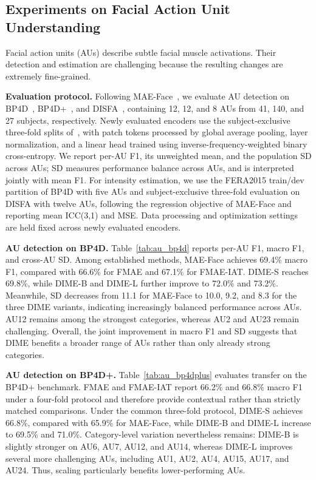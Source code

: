 \documentclass[10pt,journal,compsoc]{IEEEtran}
\begin{document}
\subsection{Experiments on Facial Action Unit Understanding}
\label{sec:exp_au}

Facial action units (AUs) describe subtle facial muscle activations. Their detection and estimation are challenging because the resulting changes are extremely fine-grained.

\noindent\textbf{Evaluation protocol.} Following MAE-Face~\cite{ma2024facial}, we evaluate AU detection on BP4D~\cite{zhang2014bp4d}, BP4D+~\cite{zhang2016multimodal}, and DISFA~\cite{mavadati2013disfa}, containing 12, 12, and 8 AUs from 41, 140, and 27 subjects, respectively. Newly evaluated encoders use the subject-exclusive three-fold splits of~\cite{ma2024facial}, with patch tokens processed by global average pooling, layer normalization, and a linear head trained using inverse-frequency-weighted binary cross-entropy. We report per-AU F1, its unweighted mean, and the population SD across AUs; SD measures performance balance across AUs, and is interpreted jointly with mean F1. For intensity estimation, we use the FERA2015 train/dev partition \cite{valstar2015fera} of BP4D with five AUs and subject-exclusive three-fold evaluation on DISFA with twelve AUs, following the regression objective of MAE-Face and reporting mean ICC(3,1) and MSE. Data processing and optimization settings are held fixed across newly evaluated encoders.


\noindent\textbf{AU detection on BP4D.} Table~\ref{tab:au_bp4d} reports per-AU F1, macro F1, and cross-AU SD. Among established methods, MAE-Face achieves 69.4\% macro F1, compared with 66.6\% for FMAE and 67.1\% for FMAE-IAT. DIME-S reaches 69.8\%, while DIME-B and DIME-L further improve to 72.0\% and 73.2\%. Meanwhile, SD decreases from 11.1 for MAE-Face to 10.0, 9.2, and 8.3 for the three DIME variants, indicating increasingly balanced performance across AUs. AU12 remains among the strongest categories, whereas AU2 and AU23 remain challenging. Overall, the joint improvement in macro F1 and SD suggests that DIME benefits a broader range of AUs rather than only already strong categories.


\noindent\textbf{AU detection on BP4D+.} Table~\ref{tab:au_bp4dplus} evaluates transfer on the BP4D+ benchmark. FMAE and FMAE-IAT report 66.2\% and 66.8\% macro F1 under a four-fold protocol and therefore provide contextual rather than strictly matched comparisons. Under the common three-fold protocol, DIME-S achieves 66.8\%, compared with 65.9\% for MAE-Face, while DIME-B and DIME-L increase to 69.5\% and 71.0\%. Category-level variation nevertheless remains: DIME-B is slightly stronger on AU6, AU7, AU12, and AU14, whereas DIME-L improves several more challenging AUs, including AU1, AU2, AU4, AU15, AU17, and AU24. Thus, scaling particularly benefits lower-performing AUs.
\end{document}
